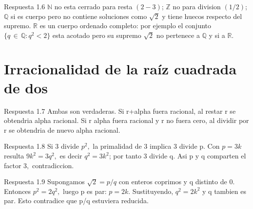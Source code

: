 \documentclass[10pt,a4paper,oneside,openany]{book}
\begin{document}
\begin{PSevenAnswerFixed}{Respuesta 1.6}
\(\mathbb{N}\) no esta cerrado para resta \((2-3)\); \(\mathbb{Z}\) no para division \((1/2)\); \(\mathbb{Q}\) si es cuerpo pero no contiene soluciones como \(\sqrt{2}\) y tiene huecos respecto del supremo. \(\mathbb{R}\) es un cuerpo ordenado completo: por ejemplo el conjunto \(\{q\,\in \,\mathbb{Q}:q^{2}<2\}\) esta acotado pero su supremo \(\sqrt{2}\) no pertenece a \(\mathbb{Q}\) y si a \(\mathbb{R}\).
\end{PSevenAnswerFixed}
\section{Irracionalidad de la raíz cuadrada de dos}
\begin{PSevenAnswerFixed}{Respuesta 1.7}
Ambas son verdaderas. Si r+alpha fuera racional, al restar r se obtendria alpha racional. Si r alpha fuera racional y r no fuera cero, al dividir por r se obtendria de nuevo alpha racional.
\end{PSevenAnswerFixed}
\begin{PSevenAnswerFixed}{Respuesta 1.8}
Si \(3\) divide \(p^{2},\) la primalidad de \(3\) implica \(3\) divide p. Con \(p=3k\) resulta \(9k^{2}=3q^{2},\) es decir \(q^{2}=3k^{2}\); por tanto \(3\) divide q. Asi p y q comparten el factor \(3,\) contradiccion.
\end{PSevenAnswerFixed}
\begin{PSevenAnswerFixed}{Respuesta 1.9}
Supongamos \(\sqrt{2}=p/q\) con enteros coprimos y q distinto de \(0\). Entonces \(p^{2}=2q^{2},\) luego p es par: \(p=2k\). Sustituyendo, \(q^{2}=2k^{2}\) y q tambien es par. Esto contradice que p/q estuviera reducida.
\end{PSevenAnswerFixed}
\end{document}
